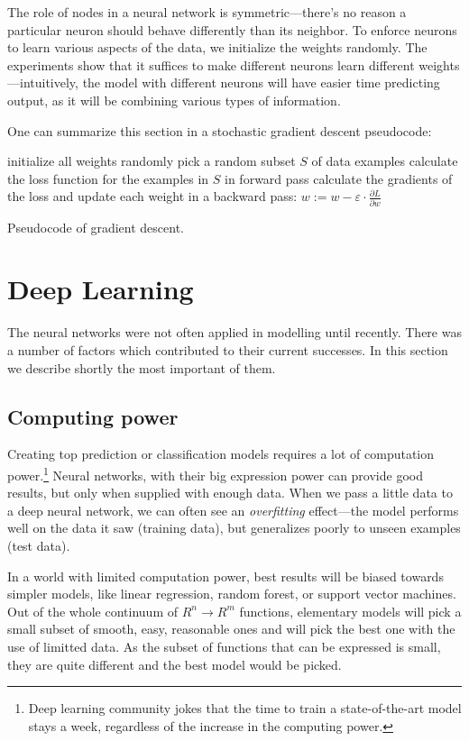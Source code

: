 The role of nodes in a neural network is symmetric---there's no reason a particular neuron should behave differently than its neighbor. To enforce neurons to learn various aspects of the data, we initialize the weights randomly. The experiments show that it suffices to make different neurons learn different weights---intuitively, the model with different neurons will have easier time predicting output, as it will be combining various types of information.

One can summarize this section in a stochastic gradient descent pseudocode:
\begin{algorithm} \label{sgd-pseudo}
  initialize all weights randomly\;
   {
    pick a random subset $S$ of data examples\;
    calculate the loss function for the examples in $S$ in forward pass\;
    calculate the gradients of the loss and update each weight in a backward pass:
    $w := w - \varepsilon \cdot \frac{\partial L}{\partial w}$
  }
  \caption{Pseudocode of gradient descent.}
\end{algorithm}

\section{Deep Learning}
The neural networks were not often applied in modelling until recently. There was a number of factors which contributed to their current successes. In this section we describe shortly the most important of them.

\subsection{Computing power}
Creating top prediction or classification models requires a lot of computation power.\footnote{Deep learning community jokes that the time to train a state-of-the-art model stays a week, regardless of the increase in the computing power.} Neural networks, with their big expression power can provide good results, but only when supplied with enough data. When we pass a little data to a deep neural network, we can often see an \emph{overfitting} effect---the model performs well on the data it saw (training data), but generalizes poorly to unseen examples (test data).

In a world with limited computation power, best results will be biased towards simpler models, like linear regression, random forest, or support vector machines. Out of the whole continuum of $R^n \rightarrow R^m$ functions, elementary models will pick a small subset of smooth, easy, reasonable ones and will pick the best one with the use of limitted data. As the subset of functions that can be expressed is small, they are quite different and the best model would be picked.

